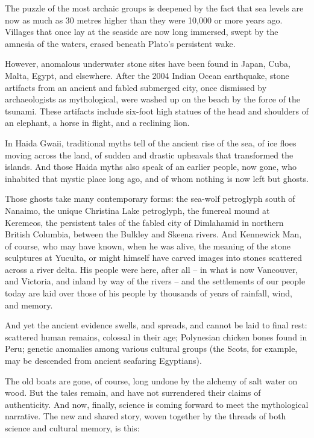 \documentclass[10pt,DIV09,letterpaper,oneside,headsepline]{scrreprt}
\begin{document}
The puzzle of the most archaic groups is deepened by the fact that sea
levels are now as much as 30 metres higher than they were 10,000 or
more years ago. Villages that once lay at the seaside are now long
immersed, swept by the amnesia of the waters, erased beneath Plato's
persistent wake.

However, anomalous underwater stone sites have been found in Japan,
Cuba, Malta, Egypt, and elsewhere. After the 2004 Indian Ocean
earthquake, stone artifacts from an ancient and fabled submerged city,
once dismissed by archaeologists as mythological, were washed up on
the beach by the force of the tsunami. These artifacts include
six-foot high statues of the head and shoulders of an elephant, a
horse in flight, and a reclining lion.

In Haida Gwaii, traditional myths tell of the ancient rise of the sea,
of ice floes moving across the land, of sudden and drastic upheavals
that transformed the islands. And those Haida myths also speak of an
earlier people, now gone, who inhabited that mystic place long ago,
and of whom nothing is now left but ghosts.

Those ghosts take many contemporary forms: the sea-wolf petroglyph
south of Nanaimo, the unique Christina Lake petroglyph, the funereal
mound at Keremeos, the persistent tales of the fabled city of
Dimlahamid in northern British Columbia, between the Bulkley and
Skeena rivers. And Kennewick Man, of course, who may have known, when
he was alive, the meaning of the stone sculptures at Yuculta, or might
himself have carved images into stones scattered across a river delta.
His people were here, after all -- in what is now Vancouver, and
Victoria, and inland by way of the rivers -- and the settlements of
our people today are laid over those of his people by thousands of
years of rainfall, wind, and memory.

And yet the ancient evidence swells, and spreads, and cannot be laid
to final rest: scattered human remains, colossal in their age;
Polynesian chicken bones found in Peru; genetic anomalies among
various cultural groups (the Scots, for example, may be descended from
ancient seafaring Egyptians).

The old boats are gone, of course, long undone by the alchemy of salt
water on wood. But the tales remain, and have not surrendered their
claims of authenticity. And now, finally, science is coming forward to
meet the mythological narrative. The new and shared story, woven
together by the threads of both science and cultural memory, is this:
\end{document}
